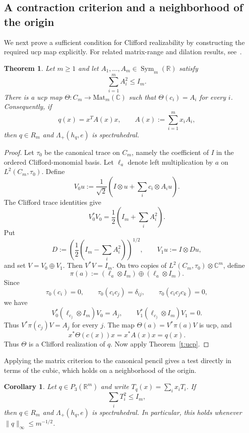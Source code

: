 \documentclass[11pt,onecolumn]{article}
\theoremstyle{blueplain}
\newtheorem{theorem}{Theorem}[section]
\newtheorem{corollary}[corollary]{Corollary}
\theoremstyle{bluedefinition}
\theoremstyle{bluedefinition}
\newcommand{\R}{\mathbb R}
\newcommand{\C}{\mathbb C}
\newcommand{\M}{\mathrm{Mat}}
\newcommand{\Sym}{\operatorname{Sym}}
\begin{document}
\subsection{A contraction criterion and a neighborhood of the origin}

We next prove a sufficient condition for Clifford realizability by constructing the required ucp map explicitly. For related matrix-range
and dilation results, see~\cite{EvertPasser,PasserShalitSolel}. 

\begin{theorem}\label{t:uniform}
Let $m\geqslant1$ and let $A_1,\ldots,A_m\in\Sym_m(\R)$ satisfy
\[
\sum_{i=1}^m A_i^2\leqslant I_m.
\]
There is a ucp map $\Theta\colon C_m\to\M_m(\C)$ such that
$\Theta(c_i)=A_i$ for every $i$. Consequently, if
\[
q(x)=x^TA(x)x,\qquad A(x):=\sum_{i=1}^m x_iA_i,
\]
then $q\in R_m$ and $\Lambda_+(h_q,e)$ is spectrahedral.
\end{theorem}

\begin{proof}
Let $\tau_0$ be the canonical trace on $C_m$, namely the coefficient of
$I$ in the ordered Clifford-monomial basis.  Let $\ell_a$ denote left
multiplication by $a$ on $L^2(C_m,\tau_0)$. Define
\[
V_0u:=\frac1{\sqrt2}
\left(I\otimes u+\sum_i c_i\otimes A_i u\right).
\]
The Clifford trace identities give
\[
V_0^*V_0=\frac12\left(I_m+\sum_iA_i^2\right).
\]
Put
\[
D:=\left(\frac12\left(I_m-\sum_iA_i^2\right)\right)^{1/2},
\qquad
V_1u:=I\otimes Du,
\]
and set $V=V_0\oplus V_1$. Then $V^*V=I_m$. On two copies of
$L^2(C_m,\tau_0)\otimes\C^m$, define
\[
\pi(a):=(\ell_a\otimes I_m)\oplus(\ell_a\otimes I_m).
\]
Since
\[
\tau_0(c_i)=0,
\qquad
\tau_0(c_ic_j)=\delta_{ij},
\qquad
\tau_0(c_ic_jc_k)=0,
\]
we have
\[
V_0^*(\ell_{c_j}\otimes I_m)V_0=A_j,
\qquad
V_1^*(\ell_{c_j}\otimes I_m)V_1=0.
\]
Thus $V^*\pi(c_j)V=A_j$ for every $j$. The map
$\Theta(a)=V^*\pi(a)V$ is ucp, and
\[
x^*\Theta(c(x))x
=x^*A(x)x
=q(x).
\]
Thus $\Theta$ is a Clifford realization of $q$. Now apply
Theorem~\ref{t:ucp}.
\end{proof}

Applying the matrix criterion to the canonical pencil gives a test
directly in terms of the cubic, which holds on a neighborhood of the origin.

\begin{corollary}\label{c:canonical-row}
Let $q\in P_3(\R^m)$ and write $T_q(x)=\sum_i x_iT_i$. If
\[
\sum_iT_i^2\leqslant I_m,
\]
then $q\in R_m$ and $\Lambda_+(h_q,e)$ is spectrahedral. In particular,
this holds whenever $\|q\|_\infty\leqslant m^{-1/2}$.
\end{corollary}
\end{document}
